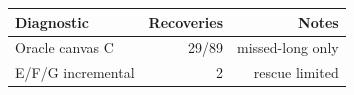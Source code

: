 \begin{tabular}{lrr}\toprule Diagnostic & Recoveries & Notes\\\midrule Oracle canvas C & 29/89 & missed-long only\\ E/F/G incremental & 2 & rescue limited\\\bottomrule\end{tabular}
